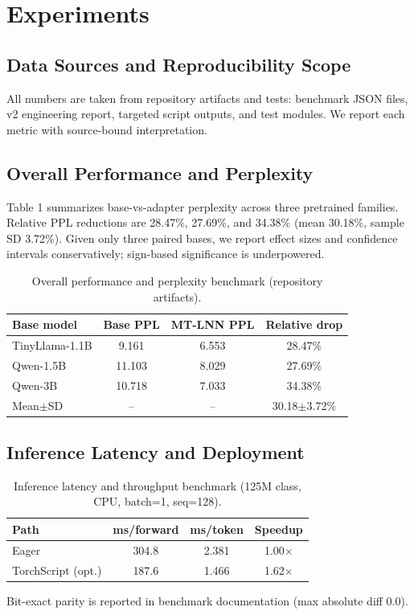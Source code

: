\documentclass[10pt,twocolumn]{article}
\begin{document}
\section{Experiments}
\subsection{Data Sources and Reproducibility Scope}
All numbers are taken from repository artifacts and tests: benchmark JSON files, v2 engineering report, targeted script outputs, and test modules. We report each metric with source-bound interpretation.

\subsection{Overall Performance and Perplexity}
Table 1 summarizes base-vs-adapter perplexity across three pretrained families. Relative PPL reductions are 28.47\%, 27.69\%, and 34.38\% (mean 30.18\%, sample SD 3.72\%). Given only three paired bases, we report effect sizes and confidence intervals conservatively; sign-based significance is underpowered.

\begin{table}[htbp]
\centering
\caption{Overall performance and perplexity benchmark (repository artifacts).}
\small
\begin{tabular}{lccc}
\toprule
Base model & Base PPL & MT-LNN PPL & Relative drop \\
\midrule
TinyLlama-1.1B & 9.161 & 6.553 & 28.47\% \\
Qwen-1.5B & 11.103 & 8.029 & 27.69\% \\
Qwen-3B & 10.718 & 7.033 & 34.38\% \\
\midrule
Mean$\pm$SD & -- & -- & 30.18$\pm$3.72\% \\
\bottomrule
\end{tabular}
\end{table}

\subsection{Inference Latency and Deployment}
\begin{table}[htbp]
\centering
\caption{Inference latency and throughput benchmark (125M class, CPU, batch=1, seq=128).}
\small
\begin{tabular}{lccc}
\toprule
Path & ms/forward & ms/token & Speedup \\
\midrule
Eager & 304.8 & 2.381 & 1.00$\times$ \\
TorchScript (opt.) & 187.6 & 1.466 & 1.62$\times$ \\
\bottomrule
\end{tabular}
\end{table}
Bit-exact parity is reported in benchmark documentation (max absolute diff 0.0).
\end{document}
